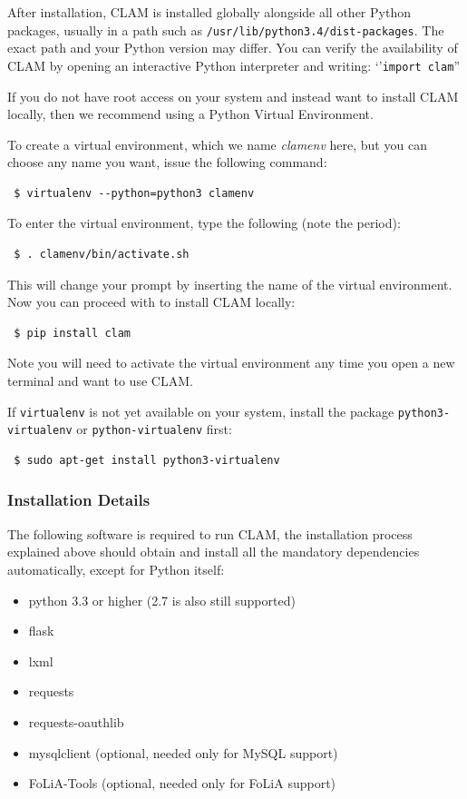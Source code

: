 \documentclass[a4paper,12pt,twoside,openright]{report}
\begin{document}
After installation, CLAM is installed globally alongside all other Python
packages, usually in a path such as \texttt{/usr/lib/python3.4/dist-packages}.
The exact path and your Python version may differ. You can verify the
availability of CLAM by opening an interactive Python interpreter and writing:
`'\texttt{import clam}''

If you do not have root access on your system and instead want to install CLAM
locally, then we recommend using a Python Virtual Environment.

To create a virtual environment, which we name \emph{clamenv} here, but you can
choose any name you want, issue the following command:

{ \small
\begin{verbatim} $ virtualenv --python=python3 clamenv \end{verbatim}
}

To enter the virtual environment, type the following (note the period):

{ \small
\begin{verbatim} $ . clamenv/bin/activate.sh \end{verbatim}
}

This will change your prompt by inserting the name of the virtual environment.
Now you can proceed with to install CLAM locally:

{ \small
\begin{verbatim} $ pip install clam \end{verbatim}
}

Note you will need to activate the virtual environment any time you open a new
terminal and want to use CLAM. 

If \texttt{virtualenv} is not yet available on your system, install the package
\texttt{python3-virtualenv} or \texttt{python-virtualenv} first:

{ \small
\begin{verbatim} $ sudo apt-get install python3-virtualenv \end{verbatim}
}

\subsubsection{Installation Details} 
 
The following software is required to run CLAM, the installation process
explained above should obtain and install all the mandatory dependencies
automatically, except for Python itself:

\begin{itemize}
\item python 3.3 or higher    (2.7 is also still supported)
\item flask
\item lxml
\item requests 
\item requests-oauthlib 
\item mysqlclient (optional, needed only for MySQL support)
\item FoLiA-Tools (optional, needed only for FoLiA support)
\end{itemize}
\end{document}
